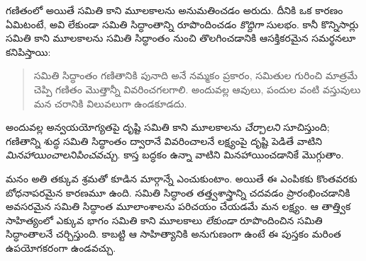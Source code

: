 \documentclass[../../../include/open-logic-section]{subfiles}
\begin{document}
గణితంలో అయితే సమితి కాని
మూలకాలను అనుమతించడం
అరుదు. దీనికి ఒక కారణం ఏమిటంటే, అవి
లేకుండా సమితి సిద్ధాంతాన్ని
రూపొందించడం \emph{కొద్దిగా} సులభం.
కానీ కొన్నిసార్లు సమితి కాని
మూలకాలను సమితి సిద్ధాంతం
నుంచి తొలగించడానికి
ఆసక్తికరమైన సమర్థనలూ
కనిపిస్తాయి:
\begin{quote}
	సమితి సిద్ధాంతం గణితానికి
	పునాది అనే నమ్మకం ప్రకారం,
	సమితుల గురించి మాత్రమే చెప్పి
	గణితం మొత్తాన్నీ వివరించగలగాలి.
	అందువల్ల ఆవులు,
	పందుల వంటి వస్తువులు మన చరానికి
	విలువలుగా ఉండకూడదు.
	\citep[p.~8]{Kunen1980}
\end{quote}
అందువల్ల అన్వయయోగ్యతపై
దృష్టి సమితి కాని మూలకాలను
\emph{చేర్చాలని} సూచిస్తుంది;
గణితాన్ని శుద్ధ సమితి
సిద్ధాంతం ద్వారానే వివరించాలనే
లక్ష్యంపై దృష్టి పెడితే
వాటిని \emph{మినహాయించాలనిపించవచ్చు}. కాస్త బద్ధకం ఉన్నా
వాటిని మినహాయించడానికే మొగ్గుతాం.

మనం అతి తక్కువ శ్రమతో కూడిన మార్గాన్నే ఎంచుకుంటాం.
అయితే ఈ ఎంపికకు కొంతవరకు బోధనాపరమైన కారణమూ ఉంది.
సమితి సిద్ధాంత తత్త్వశాస్త్రాన్ని
చదవడం ప్రారంభించడానికి
అవసరమైన సమితి సిద్ధాంత
మూలాంశాలను పరిచయం చేయడమే
మన లక్ష్యం. ఆ తాత్త్విక
సాహిత్యంలో ఎక్కువ భాగం
సమితి కాని మూలకాలు
\emph{లేకుండా} రూపొందించిన
సమితి సిద్ధాంతాలనే
చర్చిస్తుంది. కాబట్టి ఆ
సాహిత్యానికి అనుగుణంగా ఉంటే
ఈ పుస్తకం మరింత
ఉపయోగకరంగా ఉండవచ్చు.
\end{document}

